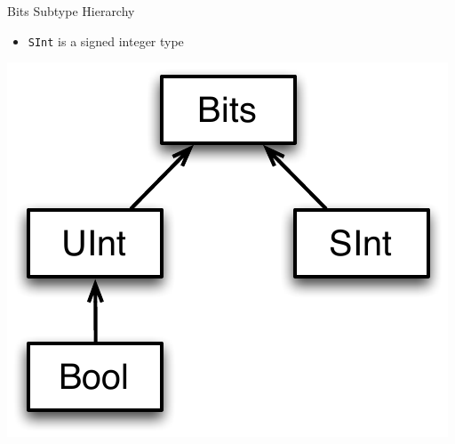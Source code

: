 \documentclass[xcolor=pdflatex,dvipsnames,table]{beamer}
\begin{document}
\begin{frame}[fragile]{Bits Subtype Hierarchy}
\begin{itemize}
\item \verb+SInt+ is a signed integer type
\end{itemize}
\begin{center}
\includegraphics[height=0.7\textheight]{figs/bits-hierarchy.pdf}
\end{center}
\end{frame}
\end{document}
